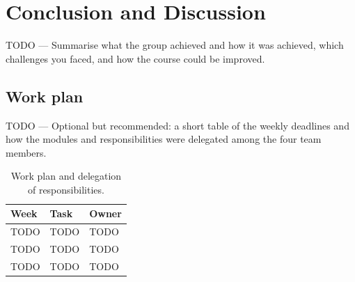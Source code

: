 \section{Conclusion and Discussion}
\label{sec:conclusion}

TODO --- Summarise what the group achieved and how it was achieved, which
challenges you faced, and how the course could be improved.

\subsection*{Work plan}

TODO --- Optional but recommended: a short table of the weekly deadlines and
how the modules and responsibilities were delegated among the four team
members.

\begin{table}[H]
\centering
\caption{Work plan and delegation of responsibilities.}
\label{tab:plan}
\begin{tabularx}{\textwidth}{@{}l X l@{}}
\toprule
\textbf{Week} & \textbf{Task} & \textbf{Owner} \\
\midrule
TODO & TODO & TODO \\
TODO & TODO & TODO \\
TODO & TODO & TODO \\
\bottomrule
\end{tabularx}
\end{table}
